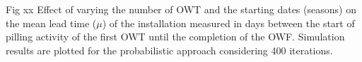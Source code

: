 Fig xx Effect of varying the number of OWT and the starting dates (seasons) on the mean lead time ($\mu$) of the installation measured in days between the start of pilling activity of the first OWT until the completion of the OWF. Simulation results are plotted for the probabilistic approach considering 400 iterations.
